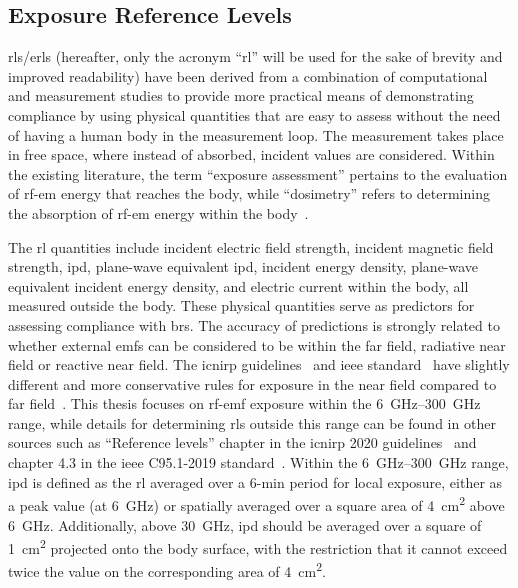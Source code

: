 \subsection{Exposure Reference Levels}
\Gls{rl}s/\gls{erl}s (hereafter, only the acronym ``\gls{rl}'' will be used for the sake of brevity and improved readability) have been derived from a combination of computational and measurement studies to provide more practical means of demonstrating compliance by using physical quantities that are easy to assess without the need of having a human body in the measurement loop.
The measurement takes place in free space, where instead of absorbed, incident values are considered.
Within the existing literature, the term ``exposure assessment'' pertains to the evaluation of \gls{rf}-\gls{em} energy that reaches the body, while ``dosimetry'' refers to determining the absorption of \gls{rf}-\gls{em} energy within the body~\cite{Chou1996Radio}.

The \gls{rl} quantities include incident electric field strength, incident magnetic field strength, \gls{ipd}, plane-wave equivalent \gls{ipd}, incident energy density, plane-wave equivalent incident energy density, and electric current within the body, all measured outside the body.
These physical quantities serve as predictors for assessing compliance with \gls{br}s.
The accuracy of predictions is strongly related to whether external \gls{emf}s can be considered to be within the far field, radiative near field or reactive near field.
The \gls{icnirp} guidelines~\cite{ICNIRP2020Guidelines} and \gls{ieee} standard~\cite{IEEE2019Standard} have slightly different and more conservative rules for exposure in the near field compared to far field~\cite{Hirata2020Difference}.
This thesis focuses on \gls{rf}-\gls{emf} exposure within the \SIrange{6}{300}{\GHz} range, while details for determining \gls{rl}s outside this range can be found in other sources such as ``Reference levels'' chapter in the \gls{icnirp} 2020 guidelines~\cite{ICNIRP2020Guidelines} and chapter 4.3 in the \gls{ieee} C95.1-2019 standard~\cite{IEEE2019Standard}.
Within the \SIrange{6}{300}{\GHz} range, \gls{ipd} is defined as the \gls{rl} averaged over a 6-min period for local exposure, either as a peak value (at \SI{6}{\GHz}) or spatially averaged over a square area of \SI{4}{\cm\squared} above \SI{6}{\GHz}.
Additionally, above \SI{30}{\GHz}, \gls{ipd} should be averaged over a square of \SI{1}{\cm\squared} projected onto the body surface, with the restriction that it cannot exceed twice the value on the corresponding area of \SI{4}{\cm\squared}.

